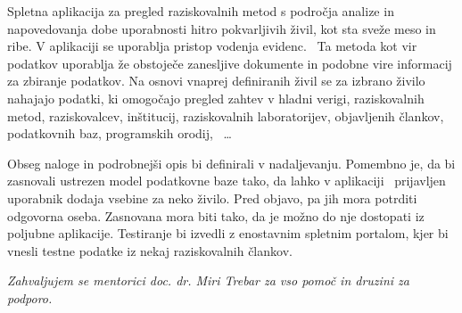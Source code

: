 \documentclass[a4paper, 12pt]{book}
\newcommand{\clearemptydoublepage}{\newpage{\pagestyle{empty}\cleardoublepage}}
\begin{document}
Spletna aplikacija za pregled raziskovalnih metod s področja analize in napovedovanja dobe
uporabnosti hitro pokvarljivih živil, kot sta sveže meso in ribe.
V aplikaciji se uporablja pristop vodenja evidenc.  Ta metoda kot vir podatkov uporablja že obstoječe
zanesljive dokumente in podobne vire informacij za zbiranje podatkov. Na osnovi vnaprej definiranih
živil se za izbrano živilo nahajajo podatki, ki omogočajo pregled zahtev v hladni verigi, raziskovalnih
metod, raziskovalcev, inštitucij, raziskovalnih laboratorijev, objavljenih člankov, podatkovnih baz,
programskih orodij,  …

Obseg naloge in podrobnejši opis bi definirali v nadaljevanju. Pomembno je, da bi zasnovali ustrezen
model podatkovne baze tako, da lahko v aplikaciji  prijavljen uporabnik dodaja vsebine za neko živilo.
Pred objavo, pa jih mora potrditi odgovorna oseba. Zasnovana mora biti tako, da je možno do nje
dostopati iz poljubne aplikacije. Testiranje bi izvedli z enostavnim spletnim portalom, kjer bi vnesli
testne podatke iz nekaj raziskovalnih člankov.

\vspace{15mm}






\vspace{2cm}

\clearemptydoublepage

\thispagestyle{empty}\mbox{}\vfill\null\it%
\noindent
Zahvaljujem se mentorici doc. dr. Miri Trebar za vso pomoč in druzini za podporo.
\rm\normalfont

\clearemptydoublepage


\pagestyle{empty}
\def\thepage{}%
\tableofcontents{}


\let\cleardoublepage=\clearpage

\end{document}
